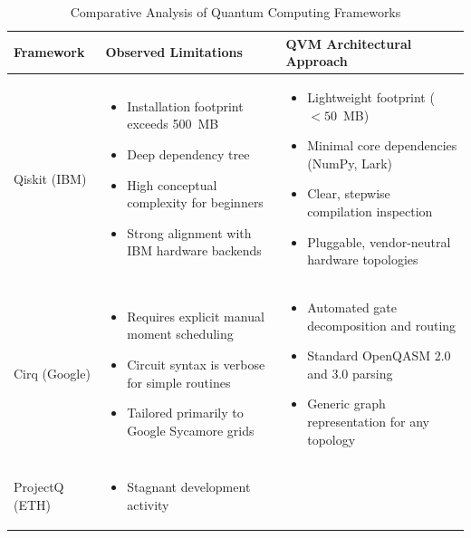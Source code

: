 \begin{table}[h!]
\centering
\caption{Comparative Analysis of Quantum Computing Frameworks}
\label{tab:related_systems}
\renewcommand{\arraystretch}{1.3}

\begin{tabularx}{\textwidth}{|p{3cm}|X|X|}
\hline
\textbf{Framework} & \textbf{Observed Limitations} & \textbf{QVM Architectural Approach} \\
\hline
Qiskit (IBM) &
\begin{itemize}[leftmargin=*, noitemsep, topsep=0pt]
    \item Installation footprint exceeds 500~MB
    \item Deep dependency tree
    \item High conceptual complexity for beginners
    \item Strong alignment with IBM hardware backends
\end{itemize}
&
\begin{itemize}[leftmargin=*, noitemsep, topsep=0pt]
    \item Lightweight footprint ($<50$~MB)
    \item Minimal core dependencies (NumPy, Lark)
    \item Clear, stepwise compilation inspection
    \item Pluggable, vendor-neutral hardware topologies
\end{itemize}
\\
\hline
Cirq (Google) &
\begin{itemize}[leftmargin=*, noitemsep, topsep=0pt]
    \item Requires explicit manual moment scheduling
    \item Circuit syntax is verbose for simple routines
    \item Tailored primarily to Google Sycamore grids
\end{itemize}
&
\begin{itemize}[leftmargin=*, noitemsep, topsep=0pt]
    \item Automated gate decomposition and routing
    \item Standard OpenQASM 2.0 and 3.0 parsing
    \item Generic graph representation for any topology
\end{itemize}
\\
\hline
ProjectQ (ETH) &
\begin{itemize}[leftmargin=*, noitemsep, topsep=0pt]
    \item Stagnant development activity

\end{itemize}
\end{tabularx}
\end{table}
